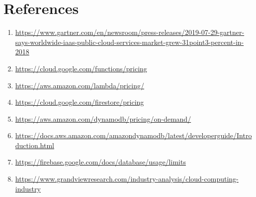 %
%
\chapter{References}
%
\label{references}

\begin{enumerate}[label=\arabic*.]
  \item \url{https://www.gartner.com/en/newsroom/press-releases/2019-07-29-gartner-says-worldwide-iaas-public-cloud-services-market-grew-31point3-percent-in-2018}
  \item \url{https://cloud.google.com/functions/pricing}
  \item \url{https://aws.amazon.com/lambda/pricing/}
  \item \url{https://cloud.google.com/firestore/pricing}
  \item \url{https://aws.amazon.com/dynamodb/pricing/on-demand/}
  \item \url{https://docs.aws.amazon.com/amazondynamodb/latest/developerguide/Introduction.html}
  \item \url{https://firebase.google.com/docs/database/usage/limits}
  \item \url{https://www.grandviewresearch.com/industry-analysis/cloud-computing-industry}
\end{enumerate}

